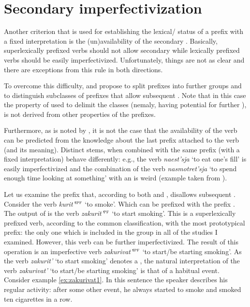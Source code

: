 \section{Secondary imperfectivization}\label{section:new:imperfectivization}
Another criterion that is used for establishing the lexical/ status of a prefix with a fixed interpretation is the (un)availability of the secondary . Basically, superlexically prefixed verbs should not allow secondary  while lexically prefixed verbs should be easily imperfectivized. Unfortunately, things are not as clear and there are exceptions from this rule in both directions. 

To overcome this difficulty, \citet{Svenonius:04b} and \citet{Tatevosov:07, Tatevosov:09} propose to split  prefixes into further groups and to distinguish subclasses of  prefixes that allow subsequent . Note that in this case the property of used to delimit the classes (nemaly, having potential for further ), is not derived from other properties of the prefixes.

Furthermore, as is noted by \citet[35]{Kagan:book}, it is not the case that the availability of the  verb can be predicted from the knowledge about the last prefix attached to the verb (and its meaning). Distinct stems, when combined with the same prefix (with a fixed interpretation) behave differently: e.g., the verb \textit{naest’sja} `to eat one's fill' is easily imperfectivized and the combination of the verb \textit{nasmotret'sja} `to spend enough time looking at something' with an  is weird (example taken from \citealt[35]{Kagan:book}).

Let us examine the  prefix  that, according to both \citet[230]{Svenonius:04b} and \citet[116]{Tatevosov:09}, disallows subsequent . Consider the verb \textit{kurit'}$^{\textsc{ipf}}$ `to smoke'. Which can be prefixed with the  prefix {.} The output of  is the verb \textit{zakurit'}$^{\textsc{pf}}$ `to start smoking'. This is a superlexically prefixed verb, according to the common classification, with the most prototypical  prefix: the only one which is included in the  group in all of the studies I examined. However, this verb can be further imperfectivized. The result of this operation is an imperfective verb \textit{zakurivat'}$^{\textsc{ipf}}$ `to start/be starting smoking'. As the verb \textit{zakurit'} `to start smoking' denotes a , the natural interpretation of the verb \textit{zakurivat'} `to start/be starting smoking'  is that of a habitual event. Consider example \ref{ex:zakurivat1}. In this sentence the speaker describes his regular activity: after some other event, he always started to smoke and smoked ten cigarettes in a row. 

